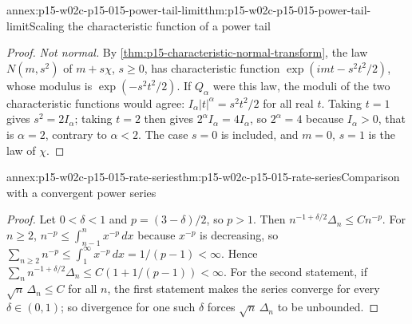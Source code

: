\begin{annexitem}{annex:p15-w02c-p15-015-power-tail-limit}{thm:p15-w02c-p15-015-power-tail-limit}{Scaling the characteristic function of a power tail}
\begin{proof}
\emph{Not normal.} By \cref{thm:p15-characteristic-normal-transform}, the
law \(N(m,s^2)\) of \(m+s\chi\), \(s\geq0\), has characteristic function
\(\exp(imt-s^2t^2/2)\), whose modulus is \(\exp(-s^2t^2/2)\). If
\(Q_\alpha\) were this law, the moduli of the two characteristic
functions would agree: \(I_\alpha|t|^\alpha=s^2t^2/2\) for all real
\(t\). Taking \(t=1\) gives \(s^2=2I_\alpha\); taking \(t=2\) then gives
\(2^\alpha I_\alpha=4I_\alpha\), so \(2^\alpha=4\) because
\(I_\alpha>0\), that is \(\alpha=2\), contrary to \(\alpha<2\). The case
\(s=0\) is included, and \(m=0\), \(s=1\) is the law of \(\chi\).
\end{proof}
\end{annexitem}

\begin{annexitem}{annex:p15-w02c-p15-015-rate-series}{thm:p15-w02c-p15-015-rate-series}{Comparison with a convergent power series}
\begin{proof}
Let \(0<\delta<1\) and \(p=(3-\delta)/2\), so \(p>1\). Then
\(n^{-1+\delta/2}\Delta_n\leq Cn^{-p}\). For \(n\geq2\),
\(n^{-p}\leq\int_{n-1}^nx^{-p}\,dx\) because \(x^{-p}\) is decreasing,
so \(\sum_{n\geq2}n^{-p}\leq\int_1^\infty x^{-p}\,dx=1/(p-1)<\infty\).
Hence \(\sum_nn^{-1+\delta/2}\Delta_n\leq C(1+1/(p-1))<\infty\).
For the second statement, if \(\sqrt n\,\Delta_n\leq C\) for all \(n\),
the first statement makes the series converge for every
\(\delta\in(0,1)\); so divergence for one such \(\delta\) forces
\(\sqrt n\,\Delta_n\) to be unbounded.
\end{proof}
\end{annexitem}

